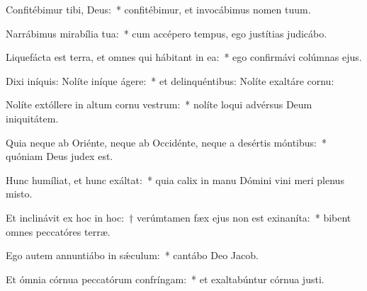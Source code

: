 \item Confitébimur tibi, Deus:~* confitébimur, et invocábimus nomen tuum.

\item Narrábimus mirabília tua:~* cum accépero tempus, ego justítias judicábo.

\item Liquefácta est terra, et omnes qui hábitant in ea:~* ego confirmávi colúmnas ejus.

\item Dixi iníquis: Nolíte iníque ágere:~* et delinquéntibus: Nolíte exaltáre cornu:

\item Nolíte extóllere in altum cornu vestrum:~* nolíte loqui advérsus Deum iniquitátem.

\item Quia neque ab Oriénte, neque ab Occidénte, neque a desértis móntibus:~* quóniam Deus judex est.

\item Hunc humíliat, et hunc exáltat:~* quia calix in manu Dómini vini meri plenus misto.

\item Et inclinávit ex hoc in hoc:~† verúmtamen fæx ejus non est exinaníta:~* bibent omnes peccatóres terræ.

\item Ego autem annuntiábo in sǽculum:~* cantábo Deo Jacob.

\item Et ómnia córnua peccatórum confríngam:~* et exaltabúntur córnua justi.
